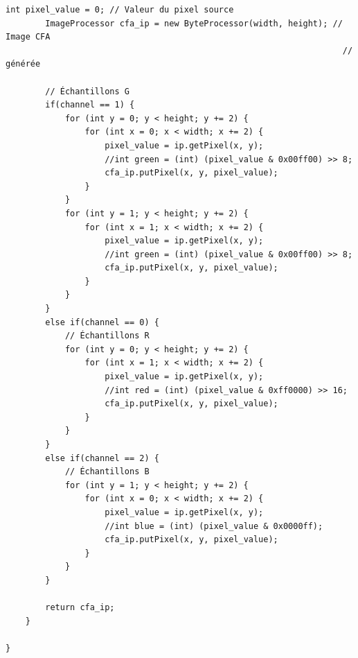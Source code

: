 \documentclass[a4paper,11pt]{article}
\begin{document}
\begin{lstlisting}[caption=Code de la troisième partie du TP]
		int pixel_value = 0; // Valeur du pixel source
		ImageProcessor cfa_ip = new ByteProcessor(width, height); // Image CFA
																	// générée

		// Échantillons G
		if(channel == 1) {
			for (int y = 0; y < height; y += 2) {
				for (int x = 0; x < width; x += 2) {
					pixel_value = ip.getPixel(x, y);
					//int green = (int) (pixel_value & 0x00ff00) >> 8;
					cfa_ip.putPixel(x, y, pixel_value);
				}
			}
			for (int y = 1; y < height; y += 2) {
				for (int x = 1; x < width; x += 2) {
					pixel_value = ip.getPixel(x, y);
					//int green = (int) (pixel_value & 0x00ff00) >> 8;
					cfa_ip.putPixel(x, y, pixel_value);
				}
			}
		}
		else if(channel == 0) {
			// Échantillons R
			for (int y = 0; y < height; y += 2) {
				for (int x = 1; x < width; x += 2) {
					pixel_value = ip.getPixel(x, y);
					//int red = (int) (pixel_value & 0xff0000) >> 16;
					cfa_ip.putPixel(x, y, pixel_value);
				}
			}
		}
		else if(channel == 2) {
			// Échantillons B
			for (int y = 1; y < height; y += 2) {
				for (int x = 0; x < width; x += 2) {
					pixel_value = ip.getPixel(x, y);
					//int blue = (int) (pixel_value & 0x0000ff);
					cfa_ip.putPixel(x, y, pixel_value);
				}
			}
		}

		return cfa_ip;
	}

}

  \end{lstlisting}
 
\end{document}

